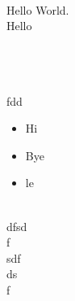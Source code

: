 \documentclass{article}
\begin{document}
\\
Hello World.\\
Hello\\
\\
\begin{comment}
 And so is this one
...

\end{comment}\\
\\
fdd\\

\begin{itemize}
\item  Hi
\item  Bye
\item  le

\end{itemize}\\
dfsd\\
f\\
sdf\\
ds\\
f\\
\end{document}

